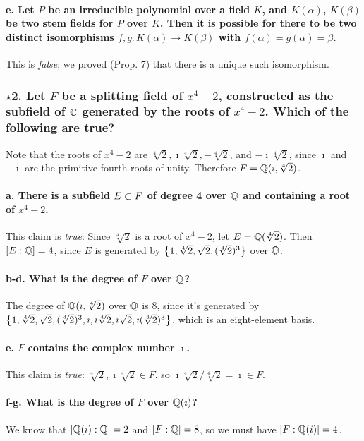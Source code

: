 \paragraph*{e. Let $P$ be an irreducible polynomial over a field $K$, and $K(\alpha)$, $K(\beta)$ be two stem fields for $P$ over $K$. Then it is possible for there to be two distinct isomorphisms $f,g: K(\alpha) \to K(\beta)$ with $f(\alpha) = g(\alpha) = \beta$.}
This is \emph{false}; we proved (Prop. 7) that there is a unique such isomorphism.

\subsubsection*{$\star$2. Let $F$ be a splitting field of $x^4-2$, constructed as the subfield of $\mathbb{C}$ generated by the roots of $x^4 - 2$. Which of the following are true?}
Note that the roots of $x^4 - 2$ are $\sqrt[4]{2}, \imath \sqrt[4]{2}, -\sqrt[4]{2}$, and $-\imath \sqrt[4]{2}$, since $\imath$ and $-\imath$ are the primitive fourth roots of unity. Therefore $F = \mathbb{Q}(\imath, \sqrt[4]{2})$.

\paragraph*{a. There is a subfield $E \subset F$ of degree 4 over $\mathbb{Q}$ and containing a root of $x^4 - 2$.}
This claim is \emph{true}: Since $\sqrt[4]{2}$ is a root of $x^4 - 2$, let $E = \mathbb{Q}(\sqrt[4]{2})$. 
Then $[E: \mathbb{Q}] = 4$, since $E$ is generated by $\left\{1, \sqrt[4]{2}, \sqrt{2}, (\sqrt[4]{2})^3\right\}$ over $\mathbb{Q}$.

\paragraph*{b-d. What is the degree of $F$ over $\mathbb{Q}$?}
The degree of $\mathbb{Q}(\imath, \sqrt[4]{2})$ over $\mathbb{Q}$ is 8, since it's generated by $\left\{1, \sqrt[4]{2}, \sqrt{2}, (\sqrt[4]{2})^3, \imath, \imath\sqrt[4]{2}, \imath\sqrt{2}, \imath(\sqrt[4]{2})^3\right\}$, which is an eight-element basis.

\paragraph*{e. $F$ contains the complex number $\imath$.}
This claim is \emph{true}: $\sqrt[4]{2}, \imath \sqrt[4]{2} \in F$, so $\imath \sqrt[4]{2} / \sqrt[4]{2} = \imath \in F$.

\paragraph*{f-g. What is the degree of $F$ over $\mathbb{Q}(\imath)$?}
We know that $[\mathbb{Q}(\imath):\mathbb{Q}] = 2$ and $[F:\mathbb{Q}] = 8$, so we must have $[F:\mathbb{Q}(i)] = 4$.

